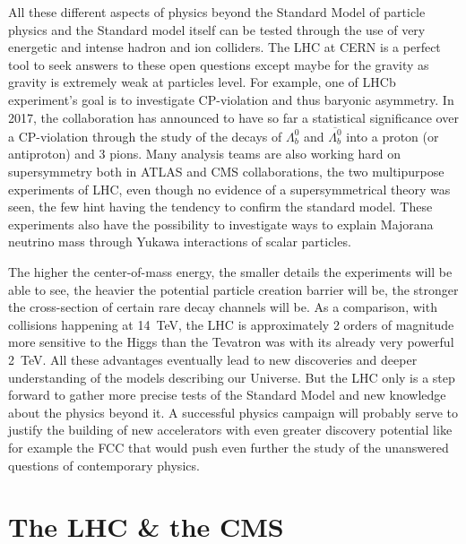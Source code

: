 	All these different aspects of physics beyond the Standard Model of particle physics and the Standard model itself can be tested through the use of very energetic and intense hadron and ion colliders. The LHC at CERN is a perfect tool to seek answers to these open questions except maybe for the gravity as gravity is extremely weak at particles level. For example, one of LHCb experiment's goal is to investigate CP-violation and thus baryonic asymmetry. In 2017, the collaboration has announced to have so far a  statistical significance over a CP-violation through the study of the decays of $\Lambda^0_b$ and $\overline{\Lambda^0_b}$ into a proton (or antiproton) and 3 pions. Many analysis teams are also working hard on supersymmetry both in ATLAS and CMS collaborations, the two multipurpose experiments of LHC, even though no evidence of a supersymmetrical theory was seen, the few hint having the tendency to confirm the standard model. These experiments also have the possibility to investigate ways to explain Majorana neutrino mass through Yukawa interactions of scalar particles.
	
	The higher the center-of-mass energy, the smaller details the experiments will be able to see, the heavier the potential particle creation barrier will be, the stronger the cross-section of certain rare decay channels will be. As a comparison, with collisions happening at \SI{14}{TeV}, the LHC is approximately 2 orders of magnitude more sensitive to the Higgs than the Tevatron was with its already very powerful \SI{2}{TeV}. All these advantages eventually lead to new discoveries and deeper understanding of the models describing our Universe. But the LHC only is a step forward to gather more precise tests of the Standard Model and new knowledge about the physics beyond it. A successful physics campaign will probably serve to justify the building of new accelerators with even greater discovery potential like for example the \acf{FCC} that would push even further the study of the unanswered questions of contemporary physics.

\section{The \acl{LHC} \& the \acl{CMS}}
\label{chapt2:sec:LHC-CMS}

